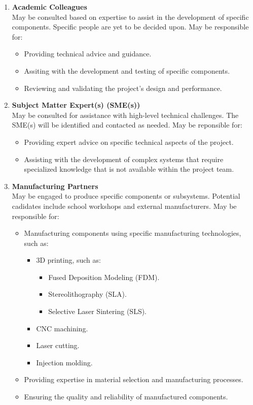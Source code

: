 \documentclass[12pt]{article}
\begin{document}
\begin{enumerate}
    \item \textbf{Academic Colleagues} \\
    May be consulted based on expertise to assist in the development of specific components. Specific people are yet to be decided upon. May be responsible for:
    \begin{itemize}
        \item Providing technical advice and guidance.
        \item Assiting with the development and testing of specific components.
        \item Reviewing and validating the project's design and performance.
    \end{itemize}
    \item \textbf{Subject Matter Expert(s) (SME(s))} \\
    May be consulted for assistance with high-level technical challenges. The SME(s) will be identified and contacted as needed. May be reponsible for:
    \begin{itemize}
        \item Providing expert advice on specific technical aspects of the project.
        \item Assisting with the development of complex systems that require specialized knowledge that is not available within the project team.
    \end{itemize}
    \item \textbf{Manufacturing Partners} \\
    May be engaged to produce specific components or subsystems. Potential cadidates include school workshops and external manufacturers. May be responsible for:
    \begin{itemize}
        \item Manufacturing components using specific manufacturing technologies, such as:
        \begin{itemize}
            \item 3D printing, such as:
            \begin{itemize}
                \item Fused Deposition Modeling (FDM).
                \item Stereolithography (SLA).
                \item Selective Laser Sintering (SLS).
            \end{itemize}
            \item CNC machining.
            \item Laser cutting.
            \item Injection molding.
        \end{itemize}
        \item Providing expertise in material selection and manufacturing processes.
        \item Ensuring the quality and reliability of manufactured components.
    \end{itemize}
\end{enumerate}
\end{document}
